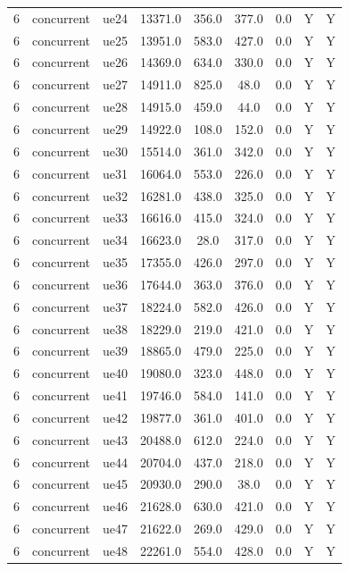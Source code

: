 \begin{table}[ht]
\begin{tabular}{|c|c|c|c|c|c|c|c|c|}
6 & concurrent & ue24 & 13371.0 & 356.0 & 377.0 & 0.0 & Y & Y \\
6 & concurrent & ue25 & 13951.0 & 583.0 & 427.0 & 0.0 & Y & Y \\
6 & concurrent & ue26 & 14369.0 & 634.0 & 330.0 & 0.0 & Y & Y \\
6 & concurrent & ue27 & 14911.0 & 825.0 & 48.0 & 0.0 & Y & Y \\
6 & concurrent & ue28 & 14915.0 & 459.0 & 44.0 & 0.0 & Y & Y \\
6 & concurrent & ue29 & 14922.0 & 108.0 & 152.0 & 0.0 & Y & Y \\
6 & concurrent & ue30 & 15514.0 & 361.0 & 342.0 & 0.0 & Y & Y \\
6 & concurrent & ue31 & 16064.0 & 553.0 & 226.0 & 0.0 & Y & Y \\
6 & concurrent & ue32 & 16281.0 & 438.0 & 325.0 & 0.0 & Y & Y \\
6 & concurrent & ue33 & 16616.0 & 415.0 & 324.0 & 0.0 & Y & Y \\
6 & concurrent & ue34 & 16623.0 & 28.0 & 317.0 & 0.0 & Y & Y \\
6 & concurrent & ue35 & 17355.0 & 426.0 & 297.0 & 0.0 & Y & Y \\
6 & concurrent & ue36 & 17644.0 & 363.0 & 376.0 & 0.0 & Y & Y \\
6 & concurrent & ue37 & 18224.0 & 582.0 & 426.0 & 0.0 & Y & Y \\
6 & concurrent & ue38 & 18229.0 & 219.0 & 421.0 & 0.0 & Y & Y \\
6 & concurrent & ue39 & 18865.0 & 479.0 & 225.0 & 0.0 & Y & Y \\
6 & concurrent & ue40 & 19080.0 & 323.0 & 448.0 & 0.0 & Y & Y \\
6 & concurrent & ue41 & 19746.0 & 584.0 & 141.0 & 0.0 & Y & Y \\
6 & concurrent & ue42 & 19877.0 & 361.0 & 401.0 & 0.0 & Y & Y \\
6 & concurrent & ue43 & 20488.0 & 612.0 & 224.0 & 0.0 & Y & Y \\
6 & concurrent & ue44 & 20704.0 & 437.0 & 218.0 & 0.0 & Y & Y \\
6 & concurrent & ue45 & 20930.0 & 290.0 & 38.0 & 0.0 & Y & Y \\
6 & concurrent & ue46 & 21628.0 & 630.0 & 421.0 & 0.0 & Y & Y \\
6 & concurrent & ue47 & 21622.0 & 269.0 & 429.0 & 0.0 & Y & Y \\
6 & concurrent & ue48 & 22261.0 & 554.0 & 428.0 & 0.0 & Y & Y \\

\end{tabular}
\end{table}
